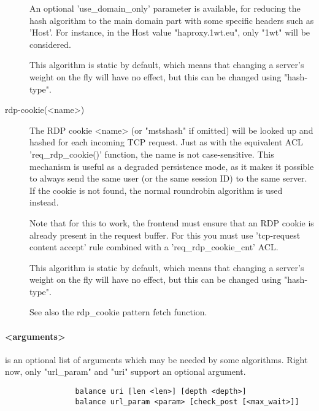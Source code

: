 \begin{description}
                  An optional 'use\_domain\_only' parameter is available, for
                  reducing the hash algorithm to the main domain part with some
                  specific headers such as 'Host'. For instance, in the Host
                  value "haproxy.1wt.eu", only "1wt" will be considered.

                  This algorithm is static by default, which means that
                  changing a server's weight on the fly will have no effect,
                  but this can be changed using "hash-type".

      \item[rdp-cookie(<name>)]
                  The RDP cookie <name> (or "mstshash" if omitted) will be
                  looked up and hashed for each incoming TCP request. Just as
                  with the equivalent ACL 'req\_rdp\_cookie()' function, the name
                  is not case-sensitive. This mechanism is useful as a degraded
                  persistence mode, as it makes it possible to always send the
                  same user (or the same session ID) to the same server. If the
                  cookie is not found, the normal roundrobin algorithm is
                  used instead.

                  Note that for this to work, the frontend must ensure that an
                  RDP cookie is already present in the request buffer. For this
                  you must use 'tcp-request content accept' rule combined with
                  a 'req\_rdp\_cookie\_cnt' ACL.

                  This algorithm is static by default, which means that
                  changing a server's weight on the fly will have no effect,
                  but this can be changed using "hash-type".

                  See also the rdp\_cookie pattern fetch function.
       \end{description}

    \paragraph*{<arguments>}
                is an optional list of arguments which may be needed by some
                algorithms. Right now, only "url\_param" and "uri" support an
                optional argument.

                \begin{verbatim}
                balance uri [len <len>] [depth <depth>]
                balance url_param <param> [check_post [<max_wait>]]
                \end{verbatim}


